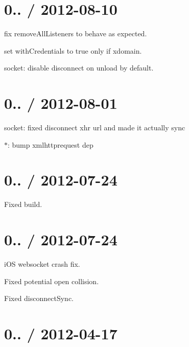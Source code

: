 \section*{0.. / 2012-\/08-\/10 }


\begin{DoxyItemize}
\item fix remove\+All\+Listeners to behave as expected.
\item set with\+Credentials to true only if xdomain.
\item socket\+: disable disconnect on unload by default.
\end{DoxyItemize}

\section*{0.. / 2012-\/08-\/01 }


\begin{DoxyItemize}
\item socket\+: fixed disconnect xhr url and made it actually sync
\item $\ast$\+: bump xmlhttprequest dep
\end{DoxyItemize}

\section*{0.. / 2012-\/07-\/24 }


\begin{DoxyItemize}
\item Fixed build.
\end{DoxyItemize}

\section*{0.. / 2012-\/07-\/24 }


\begin{DoxyItemize}
\item i\+OS websocket crash fix.
\item Fixed potential {\ttfamily open} collision.
\item Fixed disconnect\+Sync.
\end{DoxyItemize}

\section*{0.. / 2012-\/04-\/17 }



